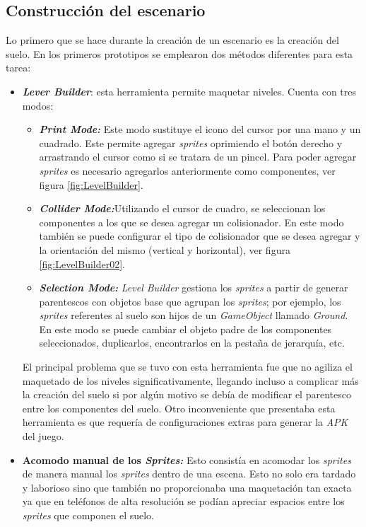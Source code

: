 \subsection{Construcción del escenario} \label{ConstruccionNivel}
Lo primero que se hace durante la creación de un escenario es la creación del
suelo. En los primeros prototipos se emplearon dos métodos diferentes para esta
tarea:  
    \begin{itemize}
        \item \textbf{\textit{Lever Builder}}: esta herramienta permite maquetar
        niveles. Cuenta con tres modos:
        \begin{itemize}
            \item \textbf{\textit{Print Mode:}} Este modo sustituye el icono del
            cursor por una mano y un cuadrado. Este permite agregar
            \textit{sprites} oprimiendo el botón derecho y arrastrando el cursor
            como si se tratara de un pincel. Para poder agregar \textit{sprites}
            es necesario agregarlos anteriormente como componentes, ver figura
            \ref{fig:LevelBuilder}.
            \item \textbf{\textit{Collider Mode:}}Utilizando el cursor de
            cuadro, se seleccionan los componentes a los que se desea agregar un
            colisionador. En este modo también se puede configurar el tipo de
            colisionador que se desea agregar y la orientación del mismo
            (vertical y horizontal), ver figura \ref{fig:LevelBuilder02}.
            \item \textbf{\textit{Selection Mode:}} \textit{Level Builder}
            gestiona los \textit{sprites} a partir de generar parentescos con
            objetos base que agrupan los \textit{sprites}; por ejemplo, los
            \textit{sprites} referentes al suelo son hijos de un
            \textit{GameObject} llamado \textit{Ground}. En este modo se puede
            cambiar el objeto padre de los componentes seleccionados,
            duplicarlos, encontrarlos en la pestaña de jerarquía, etc.  
        \end{itemize}
        
        El principal problema que se tuvo con esta herramienta fue que no
        agiliza el maquetado de los niveles significativamente, llegando
        incluso a complicar más la creación del suelo si por algún motivo se
        debía de modificar el parentesco entre los componentes del suelo. Otro
        inconveniente que presentaba esta herramienta es que requería de
        configuraciones extras para generar la \textit{APK} del juego.
        
        \item \textbf{Acomodo manual de los \textit{Sprites:}} Esto consistía en
        acomodar los \textit{sprites} de manera manual los \textit{sprites}
        dentro de una escena. Esto no solo era tardado y laborioso sino que
        también no proporcionaba una maquetación tan exacta ya que en teléfonos
        de alta resolución se podían apreciar espacios entre los
        \textit{sprites} que componen el suelo.
    \end{itemize}

